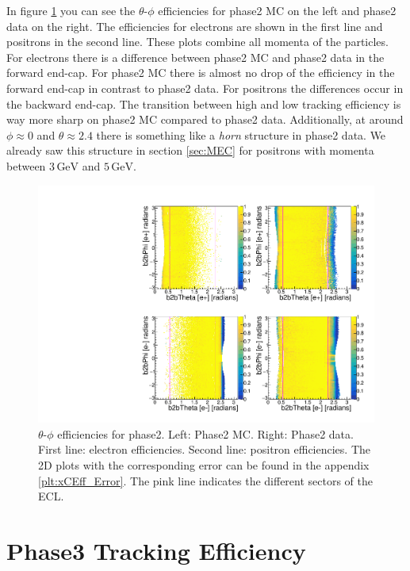 \documentclass[a4paper,11pt,twosided,final,german,openbib,pdftex,listof=totoc,bibliography=totoc]{scrbook}
\begin{document}
In figure \ref{plt:xCEff} you can see the $\theta$-$\phi$ efficiencies for phase2 MC on the left and phase2 data on the right. The efficiencies for electrons are shown in the first line and positrons in the second line. These plots combine all momenta of the particles. For electrons there is a difference between phase2 MC and phase2 data in the forward end-cap. For phase2 MC there is almost no drop of the efficiency in the forward end-cap in contrast to phase2 data. For positrons the differences occur in the backward end-cap. The transition between high and low tracking efficiency is way more sharp on phase2 MC compared to phase2 data. Additionally, at around $\phi \approx 0$ and $\theta \approx 2.4$ there is something like a \textit{horn} structure in phase2 data. We already saw this structure  in section \ref{sec:MEC} for positrons with momenta between $3\,\textrm{GeV}$ and $5\,\textrm{GeV}$.




\begin{figure}[!htbp]
	\centering
	\includegraphics[width=\textwidth]{Plots/master/xCEffTP_MCData.pdf}
	\caption[$\theta$-$\phi$ Efficiency Plots Phase2]{$\theta$-$\phi$ efficiencies for phase2. Left: Phase2 MC. Right: Phase2 data. First line: electron efficiencies. Second line: positron efficiencies. The 2D plots with the corresponding error can be found in the appendix \ref{plt:xCEff_Error}. The pink line indicates the different sectors of the ECL.}
	\label{plt:xCEff}
\end{figure}


\chapter{Phase3 Tracking Efficiency}
\label{chp:TrackingEfficiencyPhase3}
\end{document}
